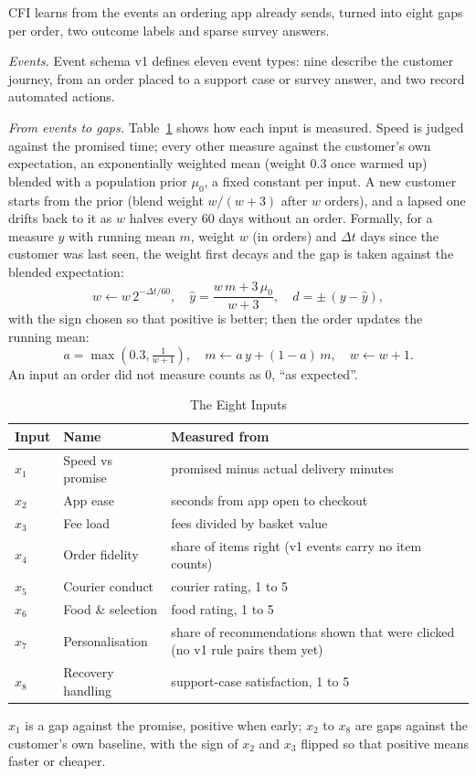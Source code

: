 \documentclass[10pt,twocolumn,letterpaper]{article}
\newcommand{\runin}[1]{\textit{#1}\hspace{0.4em}}
\begin{document}
CFI learns from the events an ordering app already sends, turned into eight gaps per order, two outcome labels and sparse survey answers.

\runin{Events.} Event schema v1 defines eleven event types: nine describe the customer journey, from an order placed to a support case or survey answer, and two record automated actions.

\runin{From events to gaps.} Table~\ref{tab:inputs} shows how each input is measured. Speed is judged against the promised time; every other measure against the customer's own expectation, an exponentially weighted mean (weight 0.3 once warmed up) blended with a population prior $\mu_0$, a fixed constant per input. A new customer starts from the prior (blend weight $w/(w+3)$ after $w$ orders), and a lapsed one drifts back to it as $w$ halves every 60 days without an order. Formally, for a measure $y$ with running mean $m$, weight $w$ (in orders) and $\Delta t$ days since the customer was last seen, the weight first decays and the gap is taken against the blended expectation:
\begin{equation}
w \leftarrow w\,2^{-\Delta t/60}, \quad \hat{y} = \frac{w\,m + 3\,\mu_0}{w + 3}, \quad d = \pm\,(y - \hat{y}),
\end{equation}
with the sign chosen so that positive is better; then the order updates the running mean:
\begin{equation}
a = \max\!\left(0.3, \tfrac{1}{w+1}\right), \quad m \leftarrow a\,y + (1-a)\,m, \quad w \leftarrow w + 1.
\end{equation}
An input an order did not measure counts as 0, ``as expected''.

\begin{table}[t]
\caption{The Eight Inputs}\label{tab:inputs}
\centering\footnotesize
\setlength{\tabcolsep}{4pt}
\begin{tabular}{@{}l l p{4.1cm}@{}}
\toprule
Input & Name & Measured from \\
\midrule
$x_1$ & Speed vs promise & promised minus actual delivery minutes \\
$x_2$ & App ease & seconds from app open to checkout \\
$x_3$ & Fee load & fees divided by basket value \\
$x_4$ & Order fidelity & share of items right (v1 events carry no item counts) \\
$x_5$ & Courier conduct & courier rating, 1 to 5 \\
$x_6$ & Food \& selection & food rating, 1 to 5 \\
$x_7$ & Personalisation & share of recommendations shown that were clicked (no v1 rule pairs them yet) \\
$x_8$ & Recovery handling & support-case satisfaction, 1 to 5 \\
\bottomrule
\end{tabular}
\par\smallskip\parbox{\columnwidth}{\footnotesize $x_1$ is a gap against the promise, positive when early; $x_2$ to $x_8$ are gaps against the customer's own baseline, with the sign of $x_2$ and $x_3$ flipped so that positive means faster or cheaper.}
\end{table}
\end{document}
